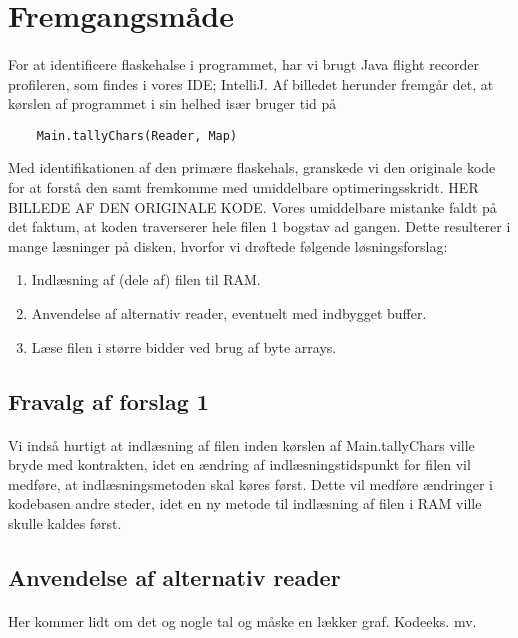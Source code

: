 \documentclass{article}
\begin{document}
\section{Fremgangsmåde}
\paragraph{}
For at identificere flaskehalse i programmet, har vi brugt Java flight recorder profileren, som findes i vores IDE; IntelliJ. 
Af billedet herunder fremgår det, at kørslen af programmet i sin helhed især bruger tid på \begin{verbatim}
    Main.tallyChars(Reader, Map)
\end{verbatim}
Med identifikationen af den primære flaskehals, granskede vi den originale kode for at forstå den samt fremkomme med umiddelbare optimeringsskridt.
HER BILLEDE AF DEN ORIGINALE KODE.
Vores umiddelbare mistanke faldt på det faktum, at koden traverserer hele filen 1 bogstav ad gangen. Dette resulterer i mange læsninger på disken, hvorfor vi drøftede følgende løsningsforslag:
\begin{enumerate}
    \item Indlæsning af (dele af) filen til RAM.
    \item Anvendelse af alternativ reader, eventuelt med indbygget buffer.
    \item Læse filen i større bidder ved brug af byte arrays.
\end{enumerate}
\subsection{Fravalg af forslag 1}
\paragraph{}Vi indså hurtigt at indlæsning af filen inden kørslen af Main.tallyChars ville bryde med kontrakten, idet en ændring af indlæsningstidspunkt for filen vil medføre, at indlæsningsmetoden skal køres først. Dette vil medføre ændringer i kodebasen andre steder, idet en ny metode til indlæsning af filen i RAM ville skulle kaldes først.
\subsection{Anvendelse af alternativ reader}
\paragraph{}Her kommer lidt om det og nogle tal og måske en lækker graf. Kodeeks. mv.
\end{document}
